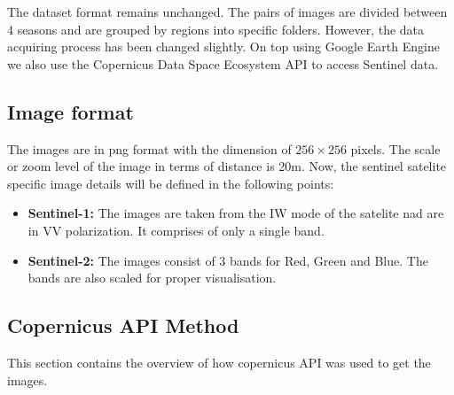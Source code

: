 The dataset format remains unchanged. The pairs of images are divided between 4 seasons and are grouped by regions into specific folders. However, the data acquiring process has been changed slightly. On top using Google Earth Engine\cite{GORELICK201718} we also use the Copernicus Data Space Ecosystem API to access Sentinel data.

\subsection{Image format}
The images are in png format with the dimension of $256\times256$ pixels. The scale or zoom level of the image in terms of distance is 20m. Now, the sentinel satelite specific image details will be defined in the following points:
\begin{itemize}
    \item \textbf{Sentinel-1:} The images are taken from the IW mode of the satelite nad are in VV polarization. It comprises of only a single band.
    \item \textbf{Sentinel-2:} The images consist of 3 bands for Red, Green and Blue. The bands are also scaled for proper visualisation.
\end{itemize}

\subsection{Copernicus API Method}
This section contains the overview of how copernicus API was used to get the images. 